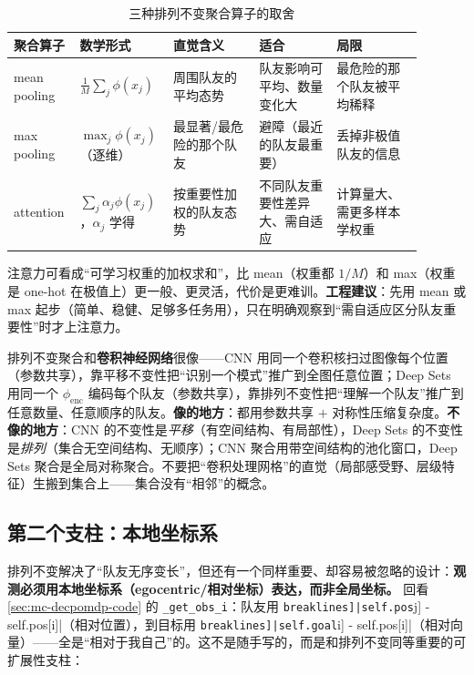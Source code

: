 \begin{table}[H]\centering\small
\caption{三种排列不变聚合算子的取舍}
\label{tab:mc-agg}
\begin{tabular}{p{0.13\linewidth}p{0.18\linewidth}p{0.20\linewidth}p{0.18\linewidth}p{0.20\linewidth}}
\toprule
聚合算子 & 数学形式 & 直觉含义 & 适合 & 局限 \\
\midrule
mean pooling & $\frac1M\sum_j\phi(x_j)$ & 周围队友的平均态势 & 队友影响可平均、数量变化大 & 最危险的那个队友被平均稀释 \\
max pooling & $\max_j\phi(x_j)$（逐维） & 最显著/最危险的那个队友 & 避障（最近的队友最重要） & 丢掉非极值队友的信息 \\
attention & $\sum_j\alpha_j\phi(x_j)$，$\alpha_j$ 学得 & 按重要性加权的队友态势 & 不同队友重要性差异大、需自适应 & 计算量大、需更多样本学权重 \\
\bottomrule
\end{tabular}
\end{table}

\noindent 注意力可看成“可学习权重的加权求和”，比 mean（权重都 $1/M$）和 max（权重是 one-hot 在极值上）更一般、更灵活，代价是更难训。\textbf{工程建议}：先用 mean 或 max 起步（简单、稳健、足够多任务用），只在明确观察到“需自适应区分队友重要性”时才上注意力。

\begin{insight}
排列不变聚合和\textbf{卷积神经网络}很像——CNN 用同一个卷积核扫过图像每个位置（参数共享），靠平移不变性把“识别一个模式”推广到全图任意位置；Deep Sets 用同一个 $\phi_{\mathrm{enc}}$ 编码每个队友（参数共享），靠排列不变性把“理解一个队友”推广到任意数量、任意顺序的队友。\textbf{像的地方}：都用参数共享 $+$ 对称性压缩复杂度。\textbf{不像的地方}：CNN 的不变性是\emph{平移}（有空间结构、有局部性），Deep Sets 的不变性是\emph{排列}（集合无空间结构、无顺序）；CNN 聚合用带空间结构的池化窗口，Deep Sets 聚合是全局对称聚合。不要把“卷积处理网格”的直觉（局部感受野、层级特征）生搬到集合上——集合没有“相邻”的概念。
\end{insight}

\subsection{第二个支柱：本地坐标系}
\label{sec:mc-egocentric}

排列不变解决了“队友无序变长”，但还有一个同样重要、却容易被忽略的设计：\textbf{观测必须用本地坐标系（egocentric/相对坐标）表达，而非全局坐标。} 回看 \cref{sec:mc-decpomdp-code} 的 \verb|_get_obs_i|：队友用 \Verb[breaklines]|self.pos[j] - self.pos[i]|（相对位置），到目标用 \Verb[breaklines]|self.goal[i] - self.pos[i]|（相对向量）——全是“相对于我自己”的。这不是随手写的，而是和排列不变同等重要的可扩展性支柱：


